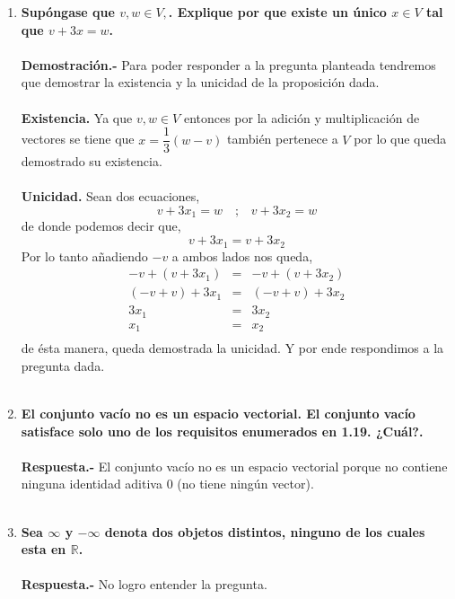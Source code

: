 \begin{multicols}{2}
\begin{enumerate}
    \item \textbf{\boldmath Supóngase que $v,w\in V,$. Explique por que existe un único $x\in V$ tal que $v+3x=w$.}\\\\
	\textbf{Demostración.-}\; Para poder responder a la pregunta planteada tendremos que demostrar la existencia y la unicidad de la proposición dada. \\\\
	 \textbf{Existencia.} Ya que $v,w\in V$ entonces por la adición y multiplicación de vectores se tiene que $x=\dfrac{1}{3}(w-v)$ también pertenece a $V$ por lo que queda demostrado su existencia.\\\\
	 \textbf{Unicidad.} Sean dos ecuaciones,
	$$v+3x_1=w\quad \mbox{;} \quad v+3x_2=w$$
	de donde podemos decir que, $$v+3x_1=v+3x_2$$
	Por lo tanto añadiendo $-v$ a ambos lados nos queda,
	$$\begin{array}{rcl}
	    -v+(v+3x_1)&=&-v+(v+3x_2)\\
	    (-v+v)+3x_1&=&(-v+v)+3x_2\\
	    3x_1&=&3x_2\\
		x_1&=&x_2\\
	\end{array}$$
	de ésta manera, queda demostrada la unicidad. Y por ende respondimos a la pregunta dada.\\\\

    \item \textbf{El conjunto vacío no es un espacio vectorial. El conjunto vacío satisface solo uno de los requisitos enumerados en 1.19. ¿Cuál?.}\\\\
	\textbf{Respuesta.-}\; El conjunto vacío no es un espacio vectorial porque no contiene ninguna identidad aditiva $0$ (no tiene ningún vector).\\\\

    \item \textbf{\boldmath Sea $\infty$ y $-\infty$ denota dos objetos distintos, ninguno de los cuales esta en $\mathbb{R}$.}\\\\
	\textbf{Respuesta.-}\; No logro entender la pregunta.\\\\


\end{enumerate}
\end{multicols}
